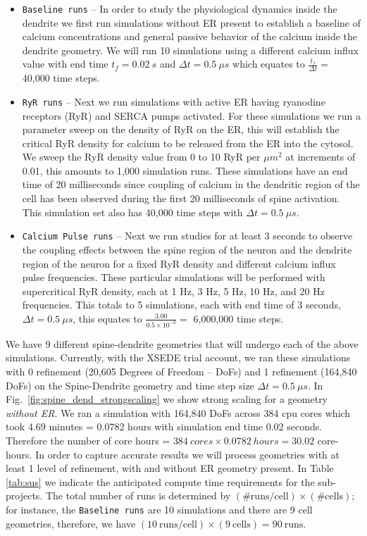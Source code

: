 \begin{itemize}
\item[1.] \texttt{Baseline runs} -- In order to study the physiological dynamics inside the dendrite we first run simulations without ER present to establish a baseline of calcium concentrations and general passive behavior of the calcium inside the dendrite geometry. We will run 10 simulations using a different calcium influx value with end time $t_f=0.02\ s$ and $\Delta t = 0.5\ \mu s$ which equates to $\frac{t_f}{\Delta t} = $ 40,000 time steps.
\item[2.] \texttt{RyR runs} -- Next we run simulations with active ER having ryanodine receptors (RyR) and SERCA pumps activated. For these simulations we run a parameter sweep on the density of RyR on the ER, this will establish the critical RyR density for calcium to be released from the ER into the cytosol. We sweep the RyR density value from 0 to 10 RyR per $\mu m^{2}$ at increments of 0.01, this amounts to 1,000 simulation runs. These simulations have an end time of 20 milliseconds since coupling of calcium in the dendritic region of the cell has been observed during the first 20 milliseconds of spine activation. This simulation set also has 40,000 time steps with $\Delta t = 0.5\ \mu s$.
\item[3.] \texttt{Calcium Pulse runs} -- Next we run studies for at least 3 seconds to observe the coupling effects between the spine region of the neuron and the dendrite region of the neuron for a fixed RyR density and different calcium influx pulse frequencies. These particular simulations will be performed with supercritical RyR density, each at 1 Hz, 3 Hz, 5 Hz, 10 Hz, and 20 Hz frequencies. This totals to 5 simulations, each with end time of 3 seconds, $\Delta t = 0.5\ \mu s$, this equates to $\frac{3.00}{0.5\times 10^{-6}}=$ 6,000,000 time steps.
\end{itemize}
We have 9 different spine-dendrite geometries that will undergo each of the above simulations. Currently, with the XSEDE trial account, we ran these simulations with 0 refinement (20,605 Degrees of Freedom -- DoFs) and 1 refinement (164,840 DoFs) on the Spine-Dendrite geometry and time step size $\Delta t =0.5\ \mu s$. In Fig.~\ref{fig:spine_dend_strongscaling} we show strong scaling for a geometry \textit{without ER}. We ran a simulation with 164,840 DoFs across 384 cpu cores which took 4.69 minutes = 0.0782 hours with simulation end time 0.02 seconds. Therefore the number of core hours = $384\ cores \times 0.0782\ hours =  30.02$ core-hours. In order to capture accurate results we will process geometries with at least 1 level of refinement, with and without ER geometry present. In Table \ref{tab:sus} we indicate the anticipated compute time requirements for the sub-projects. The total number of runs is determined by $(\#\text{runs} / \text{cell})\times(\#\text{cells})$; for instance, the \texttt{Baseline runs} are 10 simulations and there are 9 cell geometries, therefore, we have $(10\ \text{runs} / \text{cell})\times(9\ \text{cells}) = 90\ \text{runs}$. 
